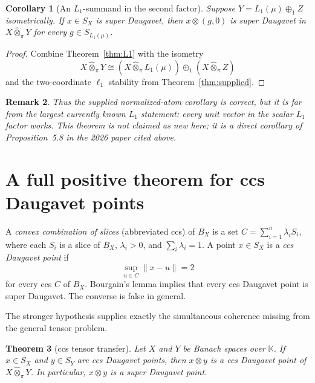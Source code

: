 \documentclass[11pt]{article}
\newtheorem{theorem}{Theorem}[section]
\newtheorem{corollary}[theorem]{Corollary}
\newtheorem{remark}[theorem]{Remark}
\theoremstyle{definition}
\newcommand{\K}{\mathbb K}
\newcommand{\whotpi}{\widehat{\otimes}_{\pi}}
\begin{document}
\begin{corollary}[An $L_1$-summand in the second factor]
Suppose $Y=L_1(\mu)\oplus_1 Z$ isometrically.  If $x\in S_X$ is super
Daugavet, then $x\otimes(g,0)$ is super Daugavet in $X\whotpi Y$ for every
$g\in S_{L_1(\mu)}$.
\end{corollary}

\begin{proof}
Combine Theorem~\ref{thm:L1} with the isometry
\[
 X\whotpi Y\cong (X\whotpi L_1(\mu))\oplus_1(X\whotpi Z)
\]
and the two-coordinate $\ell_1$ stability from
Theorem~\ref{thm:supplied}.
\end{proof}

\begin{remark}
Thus the supplied normalized-atom corollary is correct, but it is far from the
largest currently known $L_1$ statement: every unit vector in the scalar
$L_1$ factor works.  This theorem is not claimed as new here; it is a direct
corollary of Proposition~5.8 in the 2026 paper cited above.
\end{remark}

\section{A full positive theorem for ccs Daugavet points}\label{sec:ccs}

A \emph{convex combination of slices} (abbreviated ccs) of $B_X$ is a set
$C=\sum_{i=1}^n\lambda_iS_i$, where each $S_i$ is a slice of $B_X$,
$\lambda_i>0$, and $\sum_i\lambda_i=1$.  A point $x\in S_X$ is a
\emph{ccs Daugavet point} if
\[
       \sup_{u\in C}\|x-u\|=2
\]
for every ccs $C$ of $B_X$.  Bourgain's lemma implies that every ccs Daugavet
point is super Daugavet.  The converse is false in general.

The stronger hypothesis supplies exactly the simultaneous coherence missing
from the general tensor problem.

\begin{theorem}[ccs tensor transfer]\label{thm:ccs}
Let $X$ and $Y$ be Banach spaces over $\K$.  If $x\in S_X$ and $y\in S_Y$
are ccs Daugavet points, then $x\otimes y$ is a ccs Daugavet point of
$X\whotpi Y$.  In particular, $x\otimes y$ is a super Daugavet point.
\end{theorem}
\end{document}
